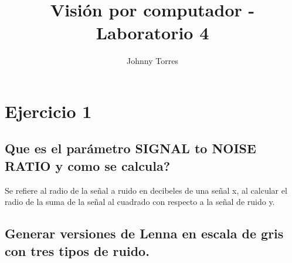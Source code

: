 \documentclass[10pt, a4paper, spanish]{article}  	%
\title{Visión por computador - Laboratorio 4}
\author{Johnny Torres}
\begin{document}
\maketitle
\section{Ejercicio 1}
\subsection{Que es el parámetro SIGNAL to NOISE RATIO y como se calcula?}
Se refiere al radio de la señal  a ruido en decibeles de una señal x, al calcular el radio de la suma de la señal al cuadrado con respecto a la señal de ruido y.

\subsection{Generar versiones de Lenna en escala de gris con tres tipos de ruido.}
\end{document}
